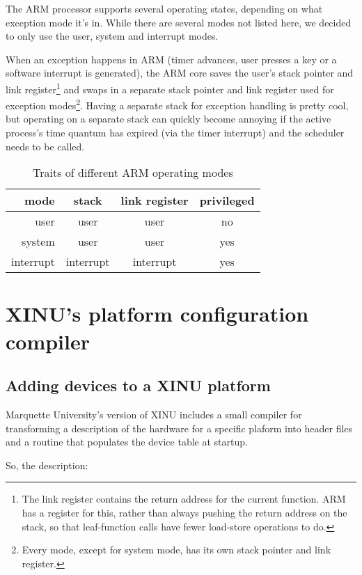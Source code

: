 \documentclass[12pt]{article}
\begin{document}
The ARM processor supports several operating states, depending on what
exception mode it's in. While there are several modes not listed here, we
decided to only use the user, system and interrupt modes.

When an exception happens in ARM (timer advances, user presses a key or a
software interrupt is generated), the ARM core saves the user's stack pointer
and link register\footnote{The link register contains the return address for
the current function. ARM has a register for this, rather than always pushing
the return address on the stack, so that leaf-function calls have fewer
load-store operations to do.} and swaps in a separate stack pointer and link
register used for exception modes\footnote{Every mode, except for system mode,
has its own stack pointer and link register.}. Having a separate stack for
exception handling is pretty cool, but operating on a separate stack can
quickly become annoying if the active process's time quantum has expired (via
the timer interrupt) and the scheduler needs to be called.

\begin{table}[h]
\caption{Traits of different ARM operating modes}
\label{arm-modes}
\center
\begin{tabular}{r || c | c | c}
mode & stack & link register & privileged \\\hline\hline
user & user & user & no \\\hline
system & user & user & yes \\\hline
interrupt & interrupt & interrupt & yes \\\hline
\end{tabular}
\end{table}

\section{XINU's platform configuration compiler}

\subsection{Adding devices to a XINU platform}

Marquette University's version of XINU includes a small compiler for
transforming a description of the hardware for a specific plaform into header
files and a routine that populates the device table at startup.

So, the description:
\end{document}
